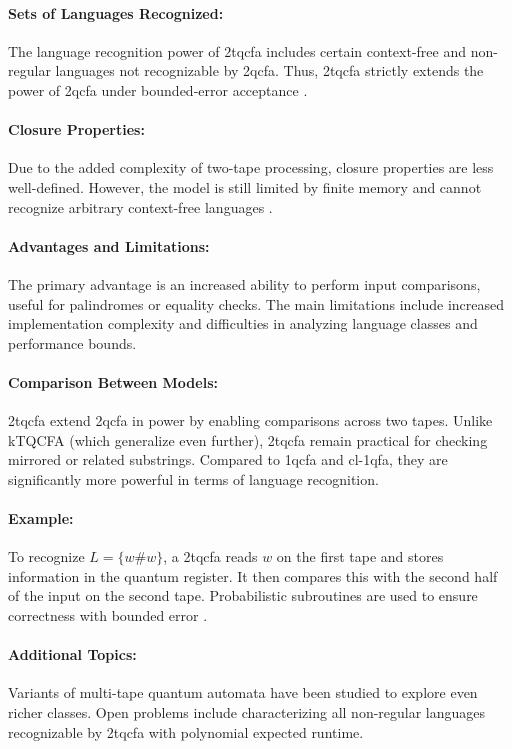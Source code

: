 \paragraph{Sets of Languages Recognized:}  
The language recognition power of \gls{2tqcfa} includes certain context-free and non-regular languages not recognizable by \gls{2qcfa}. Thus, \gls{2tqcfa} strictly extends the power of \gls{2qcfa} under bounded-error acceptance \cite{zheng2011two}.

\paragraph{Closure Properties:}  
Due to the added complexity of two-tape processing, closure properties are less well-defined. However, the model is still limited by finite memory and cannot recognize arbitrary context-free languages \cite{li2015hybrid}.

\paragraph{Advantages and Limitations:}  
The primary advantage is an increased ability to perform input comparisons, useful for palindromes or equality checks. The main limitations include increased implementation complexity and difficulties in analyzing language classes and performance bounds.

\paragraph{Comparison Between Models:}  
\gls{2tqcfa} extend \gls{2qcfa} in power by enabling comparisons across two tapes. Unlike kTQCFA (which generalize even further), \gls{2tqcfa} remain practical for checking mirrored or related substrings. Compared to \gls{1qcfa} and \gls{cl-1qfa}, they are significantly more powerful in terms of language recognition.

\paragraph{Example:}  
To recognize $L = \{ w \# w \}$, a \gls{2tqcfa} reads $w$ on the first tape and stores information in the quantum register. It then compares this with the second half of the input on the second tape. Probabilistic subroutines are used to ensure correctness with bounded error \cite{zheng2011two}.

\paragraph{Additional Topics:}  
Variants of multi-tape quantum automata have been studied to explore even richer classes. Open problems include characterizing all non-regular languages recognizable by \gls{2tqcfa} with polynomial expected runtime.


